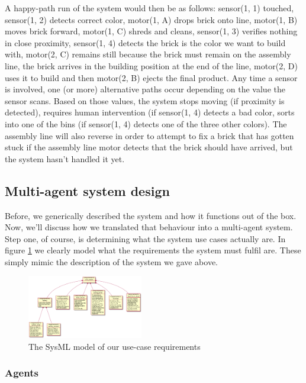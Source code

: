 \documentclass[conference]{IEEEtran}
\begin{document}
A happy-path run of the system would then be as follows: sensor(1, 1) touched, sensor(1, 2) detects correct color, motor(1, A) drops brick onto line, motor(1, B) moves brick forward, motor(1, C) shreds and cleans, sensor(1, 3) verifies nothing in close proximity, sensor(1, 4) detects the brick is the color we want to build with, motor(2, C) remains still because the brick must remain on the assembly line, the brick arrives in the building position at the end of the line, motor(2, D) uses it to build and then motor(2, B) ejects the final product. 
Any time a sensor is involved, one (or more) alternative paths occur depending on the value the sensor scans. Based on those values, the system stops moving (if proximity is detected), requires human intervention (if sensor(1, 4) detects a bad color, sorts into one of the bins (if sensor(1, 4) detects one of the three other colors). The assembly line will also reverse in order to attempt to fix a brick that has gotten stuck if the assembly line motor detects that the brick should have arrived, but the system hasn't handled it yet.

\subsection{Multi-agent system design}

Before, we generically described the system and how it functions out of the box. Now, we'll discuss how we translated that behaviour into a multi-agent system. Step one, of course, is determining what the system use cases actually are. In figure \ref{requirements} we clearly model what the requirements the system must fulfil are. These simply mimic the description of the system we gave above.

\begin{figure}[htbp]
\centerline{\includegraphics[width=0.45\textwidth]{sysml/requirements.png}}
\caption{The SysML\cite{sysml} model of our use-case requirements}
\label{requirements}
\end{figure}


\subsubsection{Agents} 
\end{document}
